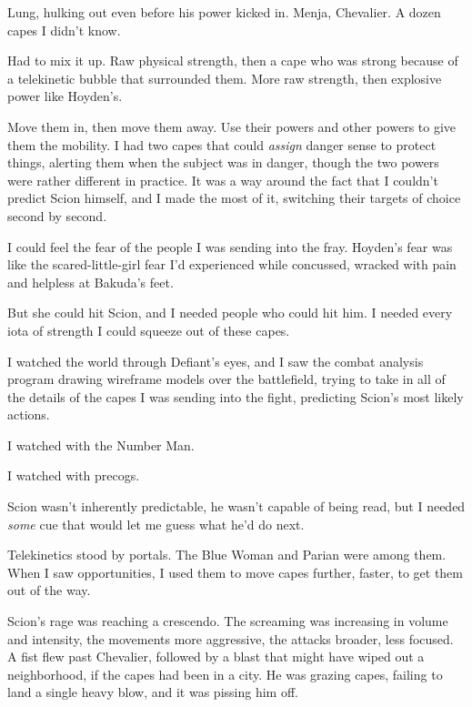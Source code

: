 Lung, hulking out even before his power kicked in.  Menja, Chevalier.  A dozen capes I didn't know.



Had to mix it up.  Raw physical strength, then a cape who was strong because of a telekinetic bubble that surrounded them.  More raw strength, then explosive power like Hoyden's.



Move them in, then move them away.  Use their powers and other powers to give them the mobility.  I had two capes that could \emph{assign} danger sense to protect things, alerting them when the subject was in danger, though the two powers were rather different in practice.  It was a way around the fact that I couldn't predict Scion himself, and I made the most of it, switching their targets of choice second by second.



I could feel the fear of the people I was sending into the fray.  Hoyden's fear was like the scared-little-girl fear I'd experienced while concussed, wracked with pain and helpless at Bakuda's feet.



But she could hit Scion, and I needed people who could hit him.  I needed every iota of strength I could squeeze out of these capes.



I watched the world through Defiant's eyes, and I saw the combat analysis program drawing wireframe models over the battlefield, trying to take in all of the details of the capes I was sending into the fight, predicting Scion's most likely actions.



I watched with the Number Man.



I watched with precogs.



Scion wasn't inherently predictable, he wasn't capable of being read, but I needed \emph{some} cue that would let me guess what he'd do next.



Telekinetics stood by portals.  The Blue Woman and Parian were among them.  When I saw opportunities, I used them to move capes further, faster, to get them out of the way.



Scion's rage was reaching a crescendo.  The screaming was increasing in volume and intensity, the movements more aggressive, the attacks broader, less focused.  A fist flew past Chevalier, followed by a blast that might have wiped out a neighborhood, if the capes had been in a city.  He was grazing capes, failing to land a single heavy blow, and it was pissing him off.



